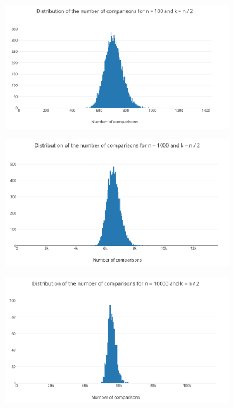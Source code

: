 \documentclass[12pt,a4paper]{article}
\begin{document}

\begin{figure}[ht!]
  \centering
  \includegraphics[width=0.9\textwidth]{img/n100k50.png}
  \caption{}
  \label{fig:}
\end{figure}

\begin{figure}[ht!]
  \centering
  \includegraphics[width=0.9\textwidth]{img/n1000k500.png}
  \caption{}
  \label{fig:}
\end{figure}

\begin{figure}[ht!]
  \centering
  \includegraphics[width=0.9\textwidth]{img/n10000k5000.png}
  \caption{}
  \label{fig:}
\end{figure}
\end{document}
